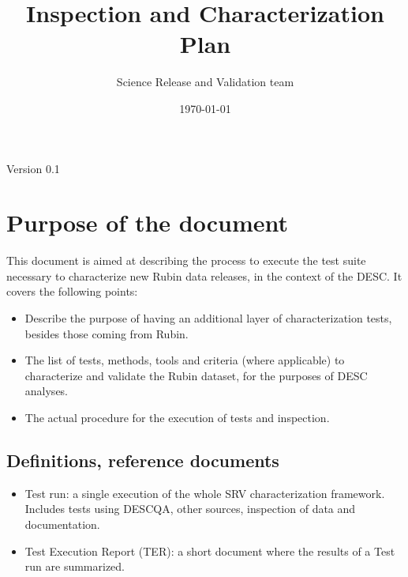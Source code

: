 \documentclass[12pt, a4paper]{article}
\title{Inspection and Characterization Plan} %
\author{Science Release and Validation team} %
\date{\today} %
\begin{document}
\maketitle %

\begin{center}
Version 0.1
\end{center}



\section{Purpose of the document}

This document is aimed at describing the process to execute the test suite necessary to characterize new Rubin data releases, in the context of the DESC. It covers the following points:

\begin{itemize}
\item Describe the purpose of having an additional layer of characterization tests, besides those coming from Rubin.
\item The list of tests, methods, tools and criteria (where applicable) to characterize and validate the Rubin dataset, for the purposes of DESC analyses.
\item The actual procedure for the execution of tests and inspection.
\end{itemize}


\subsection{Definitions, reference documents}

\begin{itemize}
\item Test run: a single execution of the whole SRV characterization framework. Includes tests using DESCQA, other sources, inspection of data and documentation.
\item Test Execution Report (TER): a short document where the results of a Test run are summarized.
\end{itemize}
 
\end{document}
